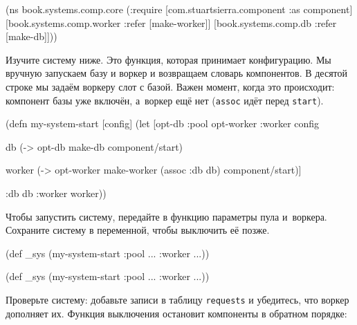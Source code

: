 \else

\begin{english}
  \begin{clojure}
(ns book.systems.comp.core
  (:require
   [com.stuartsierra.component :as component]
   [book.systems.comp.worker :refer [make-worker]]
   [book.systems.comp.db :refer [make-db]]))
  \end{clojure}
\end{english}

\fi

Изучите систему ниже. Это функция, которая принимает конфигурацию. Мы вручную
запускаем базу и воркер и возвращаем словарь компонентов. В десятой строке мы
задаём воркеру слот с базой. Важен момент, когда это происходит: компонент базы
уже включён, а~воркер ещё нет (\verb|assoc| идёт перед \verb|start|).

\begin{english}
  \begin{clojure/lines}
(defn my-system-start
  [config]
  (let [{opt-db :pool
         opt-worker :worker} config

        db (-> opt-db
               make-db
               component/start)

        worker (-> opt-worker
                   make-worker
                   (assoc :db db)
                   component/start)]

    {:db db :worker worker}))
  \end{clojure/lines}
\end{english}

Чтобы запустить систему, передайте в функцию параметры пула и~воркера. Сохраните
систему в переменной, чтобы выключить её позже.

\ifnarrow

\begin{english}
  \begin{clojure}
(def _sys
  (my-system-start
    {:pool {...} :worker {...}}))
  \end{clojure}
\end{english}

\else

\begin{english}
  \begin{clojure}
(def _sys (my-system-start {:pool {...} :worker {...}}))
  \end{clojure}
\end{english}

\fi

Проверьте систему: добавьте записи в таблицу \verb|requests| и убедитесь, что
воркер дополняет их. Функция выключения остановит компоненты в обратном порядке:

